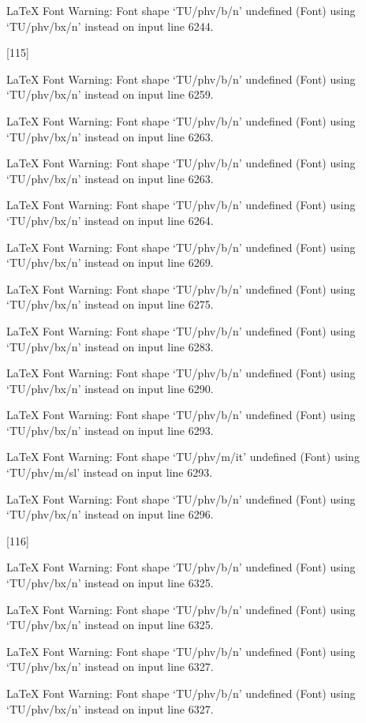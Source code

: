 LaTeX Font Warning: Font shape `TU/phv/b/n' undefined
(Font)              using `TU/phv/bx/n' instead on input line 6244.

[115]

LaTeX Font Warning: Font shape `TU/phv/b/n' undefined
(Font)              using `TU/phv/bx/n' instead on input line 6259.


LaTeX Font Warning: Font shape `TU/phv/b/n' undefined
(Font)              using `TU/phv/bx/n' instead on input line 6263.


LaTeX Font Warning: Font shape `TU/phv/b/n' undefined
(Font)              using `TU/phv/bx/n' instead on input line 6263.


LaTeX Font Warning: Font shape `TU/phv/b/n' undefined
(Font)              using `TU/phv/bx/n' instead on input line 6264.


LaTeX Font Warning: Font shape `TU/phv/b/n' undefined
(Font)              using `TU/phv/bx/n' instead on input line 6269.


LaTeX Font Warning: Font shape `TU/phv/b/n' undefined
(Font)              using `TU/phv/bx/n' instead on input line 6275.


LaTeX Font Warning: Font shape `TU/phv/b/n' undefined
(Font)              using `TU/phv/bx/n' instead on input line 6283.


LaTeX Font Warning: Font shape `TU/phv/b/n' undefined
(Font)              using `TU/phv/bx/n' instead on input line 6290.


LaTeX Font Warning: Font shape `TU/phv/b/n' undefined
(Font)              using `TU/phv/bx/n' instead on input line 6293.


LaTeX Font Warning: Font shape `TU/phv/m/it' undefined
(Font)              using `TU/phv/m/sl' instead on input line 6293.


LaTeX Font Warning: Font shape `TU/phv/b/n' undefined
(Font)              using `TU/phv/bx/n' instead on input line 6296.

[116]

LaTeX Font Warning: Font shape `TU/phv/b/n' undefined
(Font)              using `TU/phv/bx/n' instead on input line 6325.


LaTeX Font Warning: Font shape `TU/phv/b/n' undefined
(Font)              using `TU/phv/bx/n' instead on input line 6325.


LaTeX Font Warning: Font shape `TU/phv/b/n' undefined
(Font)              using `TU/phv/bx/n' instead on input line 6327.


LaTeX Font Warning: Font shape `TU/phv/b/n' undefined
(Font)              using `TU/phv/bx/n' instead on input line 6327.


